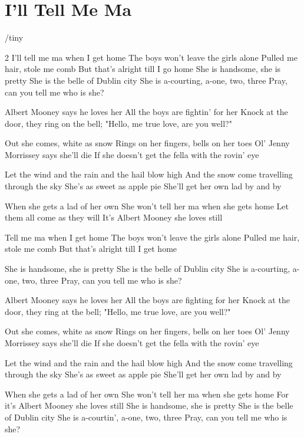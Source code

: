 \documentclass[../../../songbookMain]{subfiles}
\begin{document}
\section{I'll Tell Me Ma}
{/tiny
}

\begin{guitar}
\begin{multicols}{2}
I'll tell me ma when I get home
The boys won't leave the girls alone
Pulled me hair, stole me comb
But that's alright till I go home
She is handsome, she is pretty
She is the belle of Dublin city
She is a-courting, a-one, two, three
Pray, can you tell me who is she?

Albert Mooney says he loves her
All the boys are fightin' for her
Knock at the door, they ring on the bell;
"Hello, me true love, are you well?"

Out she comes, white as snow
Rings on her fingers, bells on her toes
Ol' Jenny Morrissey says she'll die
If she doesn't get the fella with the rovin' eye

Let the wind and the rain and the hail blow high
And the snow come travelling through the sky
She's as sweet as apple pie
She'll get her own lad by and by

When she gets a lad of her own
She won't tell her ma when she gets home
Let them all come as they will
It's Albert Mooney she loves still

Tell me ma when I get home
The boys won't leave the girls alone
Pulled me hair, stole me comb
But that's alright till I get home

She is handsome, she is pretty
She is the belle of Dublin city
She is a-courting, a-one, two, three
Pray, can you tell me who is she?

Albert Mooney says he loves her
All the boys are fighting for her
Knock at the door, they ring at the bell;
"Hello, me true love, are you well?"

Out she comes, white as snow
Rings on her fingers, bells on her toes
Ol' Jenny Morrissey says she'll die
If she doesn't get the fella with the rovin' eye

Let the wind and the rain and the hail blow high
And the snow come travelling through the sky
She's as sweet as apple pie
She'll get her own lad by and by

When she gets a lad of her own
She won't tell her ma when she gets home
For it's Albert Mooney she loves still
She is handsome, she is pretty
She is the belle of Dublin city
She is a-courtin', a-one, two, three
Pray, can you tell me who is she?
\end{multicols}
\end{guitar}
\end{document}
